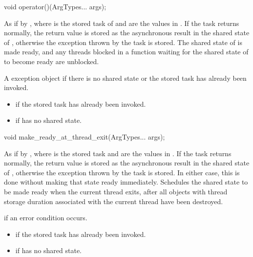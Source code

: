 %
\begin{itemdecl}
void operator()(ArgTypes... args);
\end{itemdecl}

\begin{itemdescr}
\pnum
\effects
As if by ,
where  is the
stored task of  and
 are the values in . If the task returns normally,
the return value is stored as the asynchronous result in the shared state of
, otherwise the exception thrown by the task is stored. The
shared state of  is made ready, and any threads blocked in a
function waiting for
the shared state of  to become ready are unblocked.

\pnum
\throws
A  exception object if there is no shared
state or the stored task has already been invoked.

\pnum
\errors
\begin{itemize}
\item {} if
the stored task has already been invoked.
\item {} if  has no shared state.
\end{itemize}
\end{itemdescr}

%
\begin{itemdecl}
void make_ready_at_thread_exit(ArgTypes... args);
\end{itemdecl}

\begin{itemdescr}
\pnum
\effects
As if by ,
where  is the stored task and
 are the values in . If the task returns normally,
the return value is stored as the asynchronous result in the shared state of
, otherwise the exception thrown by the task is stored. In either
case, this is done without making that state ready immediately. Schedules
the shared state to be made ready when the current thread exits,
after all objects with thread storage duration associated with the current thread
have been destroyed.

\pnum
\throws
{} if an error condition occurs.

\pnum
\errors
\begin{itemize}
\item {} if the
stored task has already been invoked.
\item {} if  has no shared state.
\end{itemize}
\end{itemdescr}

